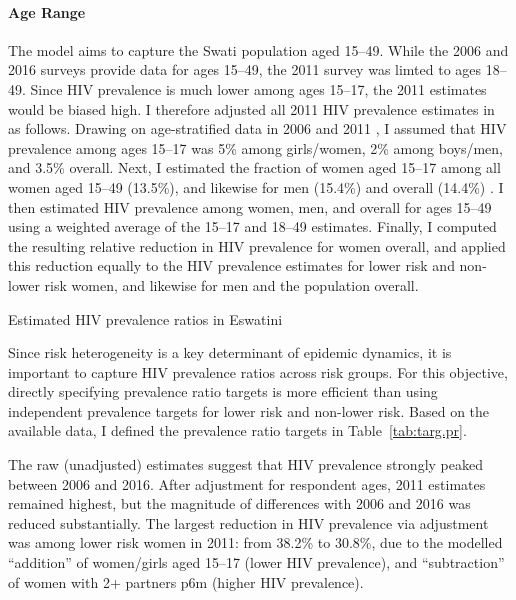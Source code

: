 \paragraph{Age Range}
The model aims to capture the Swati population aged 15--49.
While the 2006 and 2016 surveys provide data for ages 15--49,
the 2011 survey was limted to ages 18--49.
Since HIV prevalence is much lower among ages 15--17,
the 2011 estimates would be biased high.
I therefore adjusted all 2011 HIV prevalence estimates in as follows.
Drawing on age-stratified data in 2006 \cite{SDHS2006} and 2011 \cite{Bicego2013},
I assumed that HIV prevalence among ages 15--17 was
5\% among girls/women, 2\% among boys/men, and 3.5\% overall.
Next, I estimated the fraction of women aged 15--17 among all women aged 15--49 (13.5\%),
and likewise for men (15.4\%) and overall (14.4\%) \cite{DataBank}.
I then estimated HIV prevalence among women, men, and overall for ages 15--49
using a weighted average of the 15--17 and 18--49 estimates.
Finally, I computed the resulting relative reduction in HIV prevalence for women overall,
and applied this reduction equally to the HIV prevalence estimates for
lower risk and non-lower risk women, and likewise for men and the population overall.
\par
\begin{table}
  \centering
  \caption{Estimated HIV prevalence ratios in Eswatini}
  \label{tab:targ.pr}
  
\end{table}
Since risk heterogeneity is a key determinant of epidemic dynamics,
it is important to capture HIV prevalence ratios across risk groups.
For this objective, directly specifying prevalence ratio targets is more efficient than
using independent prevalence targets for lower risk and non-lower risk.
Based on the available data, I defined the prevalence ratio targets in Table~\ref{tab:targ.pr}.
\par
The raw (unadjusted) estimates suggest that HIV prevalence strongly peaked between 2006 and 2016.
After adjustment for respondent ages, 2011 estimates remained highest,
but the magnitude of differences with 2006 and 2016 was reduced substantially.
The largest reduction in HIV prevalence via adjustment
was among lower risk women in 2011: from 38.2\% to 30.8\%, due to the modelled
``addition'' of women/girls aged 15--17 (lower HIV prevalence), and
``subtraction'' of women with 2+ partners p6m (higher HIV prevalence).
